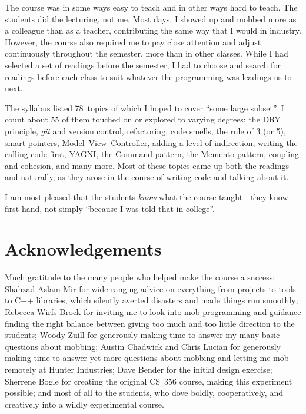 \documentclass{article}
\begin{document}
The course was in some ways easy to teach and in other ways hard to teach.
The students did the lecturing, not me. Most days, I showed up and mobbed more
as a colleague than as a teacher, contributing the same way that I would in
industry. However, the course also required me to pay close attention and
adjust continuously throughout the semester, more than in other classes. While
I had selected a set of readings before the semester, I had to choose and
search for readings before each class to suit whatever the programming was
leadings us to next.

The syllabus listed 78~topics of which I hoped to cover ``some large subset''.
I count about 55 of them touched on or explored to varying degrees:
the DRY principle, \emph{git} and version control, refactoring, code smells, 
the rule of 3 (or 5), smart pointers, Model--View--Controller, adding a level
of indirection, writing the calling code first, YAGNI, the Command pattern, the
Memento pattern, coupling and cohesion, and many more. Most of these topics
came up both the readings and naturally, as they arose in the course of
writing code and talking about it.


I am most pleased that the students \emph{know} what the course taught---they
know first-hand, not simply ``because I was told that in college''.


\section{Acknowledgements}

Much gratitude to the many people who helped make the course a success:
Shahzad Aslam-Mir for wide-ranging advice on everything from projects to tools
to C++ libraries, which silently averted disasters and made things run
smoothly; Rebecca Wirfs-Brock for inviting me to look into mob programming and
guidance finding the right balance between giving too much and too little
direction to the students; Woody Zuill for generously making time to answer my
many basic questions about mobbing; Austin Chadwick and Chris Lucian for
generously making time to answer yet more questions about mobbing and letting
me mob remotely at Hunter Industries; Dave Bender for the initial design
exercise;
Sherrene Bogle for creating the
original CS~356 course, making this experiment possible; and most of all to
the students, who dove boldly, cooperatively, and creatively into a wildly
experimental course.
\end{document}
